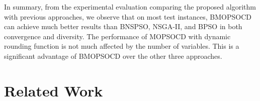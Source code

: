 \documentclass[10pt,journal,compsoc]{IEEEtran}
\begin{document}


In summary, from the experimental evaluation comparing the proposed algorithm with previous approaches, we observe that on most test instances, BMOPSOCD can achieve much better results than BNSPSO, NSGA-II, and BPSO in both convergence and diversity. The performance of MOPSOCD with dynamic rounding function is not much affected by the number of variables. This is a significant advantage of BMOPSOCD over the other three approaches.

\vspace{-3 mm}
\section{Related Work}\label{sec:related}
\end{document}
